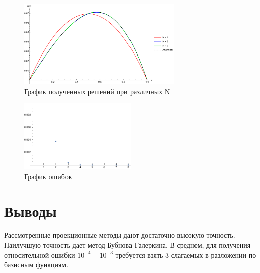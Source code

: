 \documentclass[12pt,a4paper]{article}
\begin{document}
    \begin{figure}[h]
        \centering
        \includegraphics[width=0.7\textwidth]{6.pdf}
        \caption{График полученных решений при различных N}
    \end{figure}
    \begin{figure}[h]
        \centering
        \includegraphics[width=0.5\textwidth]{6_error.pdf}
        \caption{График ошибок}
    \end{figure}

    \section{Выводы}

    Рассмотренные проекционные методы дают достаточно высокую точность. Наилучшую точность дает метод Бубнова-Галеркина. В среднем, для получения относительной ошибки $10^{-4}-10^{-3}$ требуется взять 3 слагаемых в разложении по базисным функциям.
\end{document}
